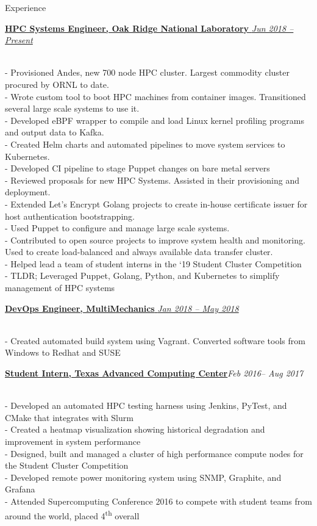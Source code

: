 \documentclass{resume} %
\begin{document}
\begin{rSection}{Experience}

\href{http://olcf.ornl.gov}
{\textbf{HPC Systems Engineer, Oak Ridge National Laboratory}
  \hfill {\em Jun 2018 -- Present}}
  
\\- Provisioned Andes, new 700 node HPC cluster. Largest commodity cluster
    procured by ORNL to date.
\\- Wrote custom tool to boot HPC machines from container images. Transitioned
    several large scale systems to use it.
\\- Developed eBPF wrapper to compile and load Linux kernel profiling programs and
    output data to Kafka.
\\- Created Helm charts and automated pipelines to move system services to
    Kubernetes.
\\- Developed CI pipeline to stage Puppet changes on bare metal servers
\\- Reviewed proposals for new HPC Systems. Assisted in their provisioning and
    deployment.
\\- Extended Let's Encrypt Golang projects to create in-house certificate issuer for
    host authentication bootstrapping.
\\- Used Puppet to configure and manage large scale systems.
\\- Contributed to open source projects to improve system health and monitoring.
    Used to create load-balanced and always available data transfer cluster.
\\- Helped lead a team of student interns in the `19 Student Cluster Competition
\\- TLDR; Leveraged Puppet, Golang, Python, and Kubernetes to simplify
    management of HPC systems

\href{http://multimechanics.com}
{\textbf{DevOps Engineer, MultiMechanics}
  \hfill
  { \em Jan 2018 -- May 2018 }}
  
\\- Created automated build system using Vagrant. Converted software tools from
    Windows to Redhat and SUSE

\href{http://tacc.utexas.edu}
{\textbf{Student Intern, Texas Advanced Computing Center}}\hfill{\em Feb 2016-- Aug 2017}

\\- Developed an automated HPC testing harness using Jenkins, PyTest, and CMake that
    integrates with Slurm
\\- Created a heatmap visualization showing historical degradation and improvement in system performance
\\- Designed, built and managed a cluster of high performance compute nodes for the Student
    Cluster Competition
\\- Developed remote power monitoring system using SNMP, Graphite, and Grafana
\\- Attended Supercomputing Conference 2016 to compete with student teams from around the
    world, placed 4\textsuperscript{th} overall


\end{rSection}
\end{document}
